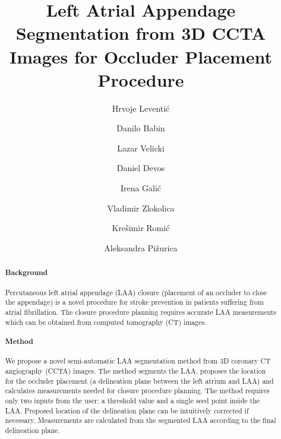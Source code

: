 \documentclass[review]{elsarticle}
\begin{document}
\begin{frontmatter}

\title{Left Atrial Appendage Segmentation from 3D CCTA Images for Occluder Placement Procedure}

\author[ferit]{Hrvoje Leventić}

\author[bd]{Danilo Babin}

\author[ikv]{Lazar Velicki}
\author[uzgent]{Daniel Devos}
\author[ferit]{Irena Galić}
\author[ftn]{Vladimir Zlokolica}
\author[ferit]{Krešimir Romić}
\author[ap]{Aleksandra Pižurica}




\address[ferit]{Faculty of Electrical Engineering, Computer Science and Information Technology, 
University J. J. Strossmayer Osijek, Croatia}
\address[bd]{imec-TELIN-IPI, Faculty of Engineering and Architecture, Ghent University, Belgium}
\address[ikv]{Faculty of Medicine, University of Novi Sad, Serbia; and Institute for Cardiovascular Diseases of Vojvodina, Sremska Kamenica, Serbia}
\address[uzgent]{University Hospital Ghent, Ghent University, Belgium}
\address[ftn]{Faculty of Technical Sciences, University of Novi Sad, Serbia}
\address[ap]{TELIN-IPI, Faculty of Engineering and Architecture, Ghent University - imec, Belgium}


\begin{abstract}
    \paragraph{\textbf{Background}}
    Percutaneous left atrial appendage (LAA) closure (placement of an
    occluder to close the appendage) is a novel procedure for stroke prevention in
    patients suffering from atrial fibrillation. 
    The closure procedure planning requires accurate LAA
    measurements which can be obtained from computed tomography (CT) images. \\
    \paragraph{\textbf{Method}}
    We propose a novel semi-automatic LAA
    segmentation method from 3D coronary CT angiography (CCTA) images. The
    method segments the LAA, proposes the location for the occluder placement
    (a delineation plane between the left atrium and LAA) and calculates
    measurements needed for closure procedure planning. 
    The method requires only two
    inputs from the user: a threshold value and a single seed point inside the
    LAA. 
    Proposed location of the delineation plane can be intuitively corrected if necessary. 
    Measurements are calculated from the segmented LAA according to the final
    delineation plane.  \\

\end{abstract}
\end{frontmatter}
\end{document}
